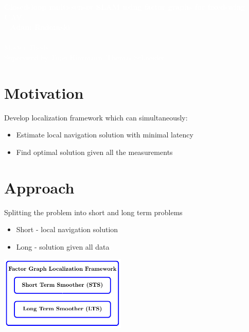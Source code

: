\documentclass[%
    fourtothree=true, %
    DepLogo=true     %
    ]{ETHpres}
\newcommand*{\ETHtitle}{Closed-loop multi-sensor SLAM using factor graphs for fixed-wing UAV.}
\newcommand*{\ETHauthor}{Adam Radomski}
\begin{document}
\ETHtitelbild\textcolor{white}{\large\textbf{\ETHtitle}}\\~\newline\hspace{6mm}\normalsize%
\textcolor{white}{
\textbf{\ETHauthor}\\ \\
Master Thesis\\
Supervised by Timo Hinzmann, Thomas Schneider}\\


\ETHslide
\section*{Motivation}
Develop localization framework which can simultaneously:
\begin{itemize}
	\item[\ETHitem] Estimate local navigation solution with minimal latency
	\item[\ETHitem] Find optimal solution given all the measurements
\end{itemize}

\clearpage

\ETHslide
\section*{Approach}
Splitting the problem into short and long term problems
\begin{itemize}
	\item[\ETHitem] Short - local navigation solution
	\item[\ETHitem] Long - solution given all data
\end{itemize}

\begin{center}
\includegraphics[width=0.45\textwidth]{TikZ_drawings/Simple_STS_and_LTS_diagram/Simple_STS_and_LTS.pdf}\\
\end{center}


\end{document}
